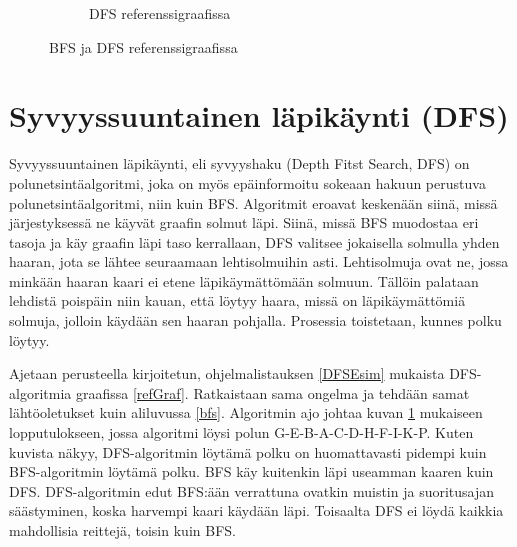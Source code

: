 \begin{figure}
\begin{subfigure}[b]{0.3\textwidth}
		\caption{DFS referenssigraafissa}\label{refDFS}
	\end{subfigure}
	\caption{BFS ja DFS referenssigraafissa}\label{refPlusBasics}
\end{figure}

\section{Syvyyssuuntainen läpikäynti (DFS)}\label{dfs}
Syvyyssuuntainen läpikäynti, eli syvyyshaku (Depth Fitst Search, DFS) on 
polunetsintäalgoritmi, joka on myös epäinformoitu sokeaan hakuun perustuva 
polunetsintäalgoritmi, niin kuin BFS.\cite{applSciLawande} Algoritmit eroavat 
keskenään siinä, missä järjestyksessä ne käyvät graafin solmut läpi. Siinä, 
missä BFS muodostaa eri tasoja ja käy graafin läpi taso kerrallaan, DFS 
valitsee jokaisella solmulla yhden haaran, jota se lähtee seuraamaan 
lehtisolmuihin asti.\cite{DFSMapColoring} Lehtisolmuja ovat ne, jossa minkään 
haaran kaari ei etene läpikäymättömään solmuun.\cite{DFSMapColoring} Tällöin 
palataan lehdistä poispäin niin kauan, että löytyy haara, missä on 
läpikäymättömiä solmuja, jolloin käydään sen haaran pohjalla. Prosessia 
toistetaan, kunnes polku löytyy. \par
	Ajetaan \textcite{DFSMapColoring} perusteella kirjoitetun, 
ohjelmalistauksen \ref{DFSEsim} mukaista DFS-algoritmia graafissa 
\ref{refGraf}. Ratkaistaan sama ongelma ja tehdään samat lähtöoletukset kuin 
aliluvussa \ref{bfs}. Algoritmin ajo johtaa kuvan \ref{refDFS} mukaiseen 
lopputulokseen, jossa algoritmi löysi polun G-E-B-A-C-D-H-F-I-K-P. 
Kuten kuvista näkyy, DFS-algoritmin löytämä polku on huomattavasti pidempi 
kuin BFS-algoritmin löytämä polku. BFS käy kuitenkin läpi useamman kaaren 
kuin DFS. DFS-algoritmin edut BFS:ään verrattuna ovatkin muistin ja 
suoritusajan säästyminen, koska harvempi kaari käydään 
läpi.\cite{applSciLawande} Toisaalta DFS ei löydä kaikkia mahdollisia reittejä, 
toisin kuin BFS.\cite{applSciLawande}

